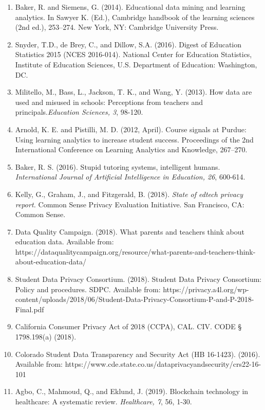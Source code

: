 \documentclass{article}
\begin{document}
\begin{enumerate}
    \label{34}
    \item Baker, R. and Siemens, G. (2014). Educational data mining and learning analytics. In Sawyer K. (Ed.), Cambridge handbook of the learning sciences (2nd ed.), 253–274. New York, NY: Cambridge University Press.
    \label{35}
    \item Snyder, T.D., de Brey, C., and Dillow, S.A. (2016). Digest of Education Statistics 2015 (NCES 2016-014). National Center for Education Statistics, Institute of Education Sciences, U.S. Department of Education: Washington, DC.
    \label{36}
    \item Militello, M., Bass, L., Jackson, T. K., and Wang, Y. (2013). How data are used and misused in schools: Perceptions from teachers and principals.\textit{Education Sciences, 3}, 98-120.
    \label{37}
    \item Arnold, K. E. and Pistilli, M. D. (2012, April). Course signals at Purdue: Using learning analytics to increase student success. Proceedings of the 2nd International Conference on Learning Analytics and Knowledge, 267–270.
    \label{38}
    \item Baker, R. S. (2016). Stupid tutoring systems, intelligent humans. \textit{International Journal of Artificial Intelligence in Education, 26}, 600-614.
    \label{39}
    \item Kelly, G., Graham, J., and Fitzgerald, B. (2018). \textit{State of edtech privacy report.} Common Sense Privacy Evaluation Initiative. San Francisco, CA: Common Sense. 
    \label{40}
    \item Data Quality Campaign. (2018). What parents and teachers think about education data. Available from: https://dataqualitycampaign.org/resource/what-parents-and-teachers-think-about-education-data/
    \label{41}
    \item Student Data Privacy Consortium. (2018). Student Data Privacy Consortium: Policy and procedures. SDPC. Available from: https://privacy.a4l.org/wp-content/uploads/2018/06/Student-Data-Privacy-Consortium-P-and-P-2018-Final.pdf 
    \label{42}
    \item California Consumer Privacy Act of 2018 (CCPA), CAL. CIV. CODE § 1798.198(a) (2018).
    \label{43}
    \item Colorado Student Data Transparency and Security Act (HB 16-1423). (2016). Available from: https://www.cde.state.co.us/dataprivacyandsecurity/crs22-16-101
    \label{44}
    \item Agbo, C., Mahmoud, Q., and Eklund, J. (2019). Blockchain technology in healthcare: A systematic review. \textit{Healthcare, 7}, 56, 1-30.

\end{enumerate}
\end{document}
